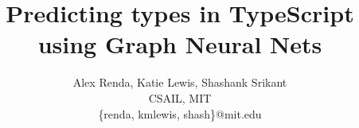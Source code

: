 \documentclass[letterpaper]{article} %
\begin{document}
\newcommand{\etc}{\textit{etc}.\xspace}
\newcommand{\ie}{\textit{i.e.}\xspace}
\newcommand{\eg}{\textit{e.g.}\xspace}
\newcommand{\ra}{$\rightarrow$}

\newcommand{\TODO}[1]{\textcolor{blue}{TODO: #1}}
\newcommand{\FIX}[1]{\textcolor{red}{CHECK: #1}}
\newcommand{\COMMENT}[1]{\textcolor{red}{COMMENT: #1}}

\newcommand{\rarro}[1][3pt]{\mathrel{%
		\hbox{\rule[\dimexpr\fontdimen22\textfont2-.2pt\relax]{#1}{.4pt}}%
		\mkern-4mu\hbox{\usefont{U}{lasy}{m}{n}\symbol{41}}}}

\newcommand{\rarr}{$\rarro$}

\newcommand{\scl}{0.5}
\newcommand{\wdth}{0.28}

\newcommand{\colorul}[2]{\setulcolor{#1}\ul{#2}}
\newcommand{\bx}[2]{
 \begin{tikzpicture}
 \node[draw,dashed,fill={#1!10}] {{#2}};
 \end{tikzpicture}
}

\setul{0.2ex}{0.4ex}
\makeatletter
\def\BState{\State\hskip-\ALG@thistlm}
\makeatother
\title{Predicting types in TypeScript using Graph Neural Nets
}

\author{Alex Renda, Katie Lewis, Shashank Srikant
\\
CSAIL, MIT
\\
\{renda, kmlewis, shash\}@mit.edu
}
\maketitle

\begin{abstract}
	
\end{abstract}





%


\medskip


\end{document}
